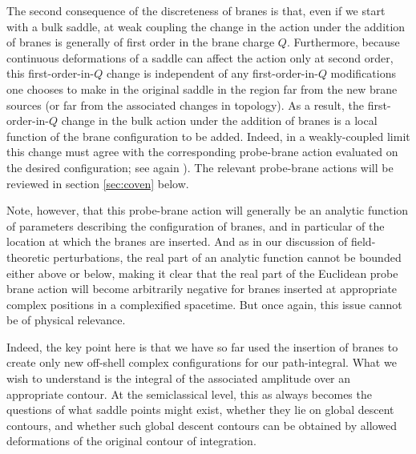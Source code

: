 \documentclass[11pt]{article}
\begin{document}
The second consequence of the discreteness of branes is that, even if we start with a bulk saddle, at weak coupling the change in the action under the addition of branes is generally of first order in the brane charge $Q$.
Furthermore, because continuous deformations of a saddle can affect the action only at second order, this first-order-in-$Q$ change is independent of any first-order-in-$Q$ modifications one chooses to make in the original saddle in the region far from the new brane sources (or far from the associated changes in topology).
As a result, the first-order-in-$Q$ change in the bulk action under the addition of branes is a local function of the brane configuration to be added.
Indeed, in a weakly-coupled limit this change must agree with the corresponding probe-brane action evaluated on the desired configuration; see again \cite{Polchinski:1995mt,Kaplan:1995cp,Simon:2011rw}).
The relevant probe-brane actions will be reviewed in section \ref{sec:coven} below.

Note, however, that this probe-brane action will generally be an analytic function of parameters describing the configuration of branes, and in particular of the location at which the branes are inserted.
And as in our discussion of field-theoretic perturbations, the real part of an analytic function cannot be bounded either above or below, making it clear that the real part of the Euclidean probe brane action will become arbitrarily negative for branes inserted at appropriate complex positions in a complexified spacetime.
But once again, this issue cannot be of physical relevance.

Indeed, the key point here is that we have so far used the insertion of branes to create only new off-shell complex configurations for our path-integral.
What we wish to understand is the integral of the associated amplitude over an appropriate contour.
At the semiclassical level, this as always becomes the questions of what saddle points might exist, whether they lie on global descent contours, and whether such global descent contours can be obtained by allowed deformations of the original contour of integration.
\end{document}
